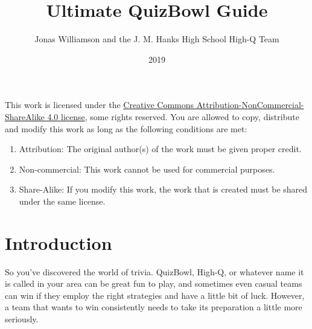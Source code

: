 \documentclass[12pt]{book}
\begin{document}
	\frontmatter
	\title{Ultimate QuizBowl Guide}
	\author{Jonas Williamson and the  J. M. Hanks High School High-Q Team}
	\date{2019}
	\maketitle
	\begin{center}

			\huge \cc \the\year
			\vspace{0.5 in}
			
			\byncsa
	\normalsize
		\end{center}
		\vspace{2 in}	
	This work is licensed under the \href{https://creativecommons.org/licenses/by-nc-sa/4.0/legalcode}{Creative Commons Attribution-NonCommercial-ShareAlike 4.0 license}, some rights reserved.  You are allowed to copy, distribute and modify this work as long as the following conditions are met:
	\begin{enumerate}
		\item Attribution: The original author(s) of the work must be given proper credit.
		\item Non-commercial: This work cannot be used for commercial purposes.
		\item Share-Alike: If you modify this work, the work that is created must be shared under the same license. 
	\end{enumerate}


	
	
	
	
	
	
	\tableofcontents

	\mainmatter
	
	
\chapter{Introduction}
So you've discovered the world of trivia. QuizBowl, High-Q, or whatever name it is called in your area can be great fun to play, and sometimes even casual teams can win if they employ the right strategies and have a little bit of luck.  However, a team that wants to win consistently needs to take its preparation a little more seriously.  
\end{document}
